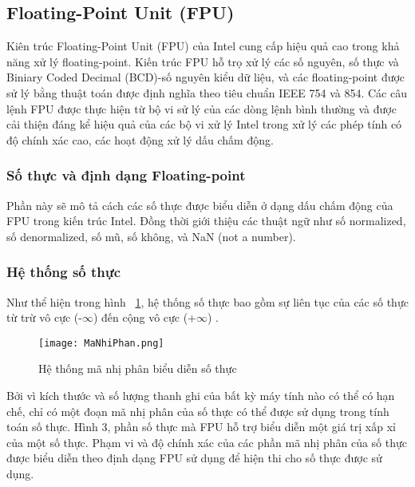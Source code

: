	
	\subsection{Floating-Point Unit (FPU)}
	Kiên trúc Floating-Point Unit (FPU) của Intel cung cấp hiệu quả cao trong khả năng xử lý floating-point. Kiến trúc FPU hỗ trọ xử lý các số nguyên, số thực và Biniary Coded Decimal (BCD)-số nguyên kiểu dữ liệu, và các floating-point được sử lý bằng thuật toán được định nghĩa theo tiêu chuẩn IEEE 754 và 854. Các câu lệnh FPU được thực hiện từ bộ vi sử lý của các dòng lệnh bình thường và được cải thiện đáng kể hiệu quả của các bộ vi xử lý Intel trong xử lý các phép tính có độ chính xác cao, các hoạt động xử lý dấu chấm động.
	
		\subsubsection{Số thực và định dạng Floating-point}	
		Phần này sẽ mô tả cách các số thực được biểu diễn ở dạng dấu chấm động của FPU trong kiến trúc Intel. Đồng thời giới thiệu các thuật ngữ như số normalized, số denormalized, số mũ, số không, và NaN (not a number). 
		
		\subsubsection*{Hệ thống số thực}
		Như thể hiện trong hình ~\ref{fig:HeThongMaNPhan}, hệ thống số thực bao gồm sự liên tục của các số thực từ trừ vô cực (-$\mathbb{\infty}$)  đến cộng vô cực (+$\mathbb{\infty}$) .
		\begin{center}
			\begin{figure}[htp]
				\begin{center}
					\texttt{[image: MaNhiPhan.png]}
				\end{center}
				\caption{Hệ thống mã nhị phân biểu diễn số thực  \protect\footnotemark}			
				\label{fig:HeThongMaNPhan}	
			\end{figure}
		\end{center}		
		
		Bởi vì kích thước và số lượng thanh ghi của bất kỳ máy tính nào có thể có hạn chế, chỉ có một đoạn mã nhị phân của số thực có thể được sử dụng trong tính toán số thực. Hình 3, phần số thực mà FPU hỗ trợ biểu diễn một giá trị xấp xỉ của một số thực. Phạm vi và độ chính xác của các phần mã nhị phân của số thực được biểu diễn theo định dạng FPU sử dụng để hiện thi cho số thực được sử dụng.
		

